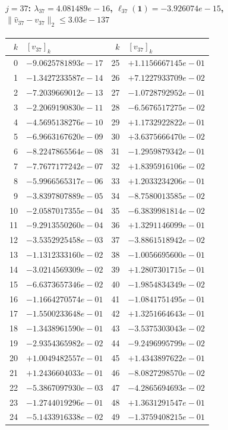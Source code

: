 \documentclass[11pt]{article}
\begin{document}
\paragraph{$j = 37$: $\lambda_{37} = 4.081489e-16$, \quad $\ell_{37}(\mathbf{1}) = -3.926074e-15$, \quad $\|\hat{v}_{37} - v_{37}\|_2 \leq 3.03e-137$}
\begin{center}
{\footnotesize
\begin{tabular}{r@{\;\;}l@{\quad}r@{\;\;}l}
\toprule
$k$ & $[v_{37}]_k$ & $k$ & $[v_{37}]_k$ \\
\midrule
0 & $-9.0625781893e-17$ & 25 & $+1.1156667145e-01$ \\
1 & $-1.3427233587e-14$ & 26 & $+7.1227933709e-02$ \\
2 & $-7.2039669012e-13$ & 27 & $-1.0728792952e-01$ \\
3 & $-2.2069190830e-11$ & 28 & $-6.5676517275e-02$ \\
4 & $-4.5695138276e-10$ & 29 & $+1.1732922822e-01$ \\
5 & $-6.9663167620e-09$ & 30 & $+3.6375666470e-02$ \\
6 & $-8.2247865564e-08$ & 31 & $-1.2959879342e-01$ \\
7 & $-7.7677177242e-07$ & 32 & $+1.8395916106e-02$ \\
8 & $-5.9966565317e-06$ & 33 & $+1.2033234206e-01$ \\
9 & $-3.8397807889e-05$ & 34 & $-8.7580013585e-02$ \\
10 & $-2.0587017355e-04$ & 35 & $-6.3839981814e-02$ \\
11 & $-9.2913550260e-04$ & 36 & $+1.3291146099e-01$ \\
12 & $-3.5352925458e-03$ & 37 & $-3.8861518942e-02$ \\
13 & $-1.1312333160e-02$ & 38 & $-1.0056695600e-01$ \\
14 & $-3.0214569309e-02$ & 39 & $+1.2807301715e-01$ \\
15 & $-6.6373657346e-02$ & 40 & $-1.9854834349e-02$ \\
16 & $-1.1664270574e-01$ & 41 & $-1.0841751495e-01$ \\
17 & $-1.5500233648e-01$ & 42 & $+1.3251664643e-01$ \\
18 & $-1.3438961590e-01$ & 43 & $-3.5375303043e-02$ \\
19 & $-2.9354365982e-02$ & 44 & $-9.2496995799e-02$ \\
20 & $+1.0049482557e-01$ & 45 & $+1.4343897622e-01$ \\
21 & $+1.2436604033e-01$ & 46 & $-8.0827298570e-02$ \\
22 & $-5.3867097930e-03$ & 47 & $-4.2865694693e-02$ \\
23 & $-1.2744019296e-01$ & 48 & $+1.3631291547e-01$ \\
24 & $-5.1433916338e-02$ & 49 & $-1.3759408215e-01$ \\
\bottomrule
\end{tabular}
}
\end{center}
\end{document}
